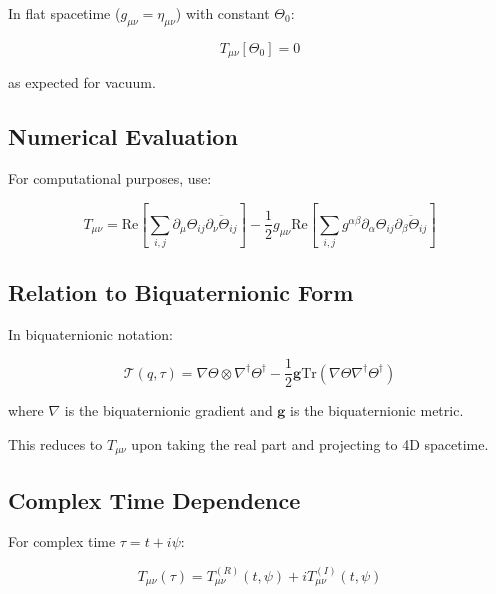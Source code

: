 In flat spacetime ($g_{\mu\nu} = \eta_{\mu\nu}$) with constant $\Theta_0$:

\begin{equation}
T_{\mu\nu}[\Theta_0] = 0
\end{equation}

as expected for vacuum.

\subsection{Numerical Evaluation}

For computational purposes, use:

\begin{equation}
\label{eq:canonical:stress_numerical}
T_{\mu\nu} = \text{Re}\left[\sum_{i,j} \partial_\mu\Theta_{ij} \overline{\partial_\nu\Theta_{ij}}\right] - \frac{1}{2} g_{\mu\nu} \text{Re}\left[\sum_{i,j} g^{\alpha\beta} \partial_\alpha\Theta_{ij} \overline{\partial_\beta\Theta_{ij}}\right]
\end{equation}

\subsection{Relation to Biquaternionic Form}

In biquaternionic notation:

\begin{equation}
\label{eq:canonical:stress_biquaternion}
\mathcal{T}(q,\tau) = \nabla\Theta \otimes \nabla^\dagger\Theta^\dagger - \frac{1}{2} \mathbf{g} \text{Tr}(\nabla\Theta \nabla^\dagger\Theta^\dagger)
\end{equation}

where $\nabla$ is the biquaternionic gradient and $\mathbf{g}$ is the biquaternionic metric.

This reduces to $T_{\mu\nu}$ upon taking the real part and projecting to 4D spacetime.

\subsection{Complex Time Dependence}

For complex time $\tau = t + i\psi$:

\begin{equation}
\label{eq:canonical:stress_complex_time}
T_{\mu\nu}(\tau) = T_{\mu\nu}^{(R)}(t,\psi) + i T_{\mu\nu}^{(I)}(t,\psi)
\end{equation}

